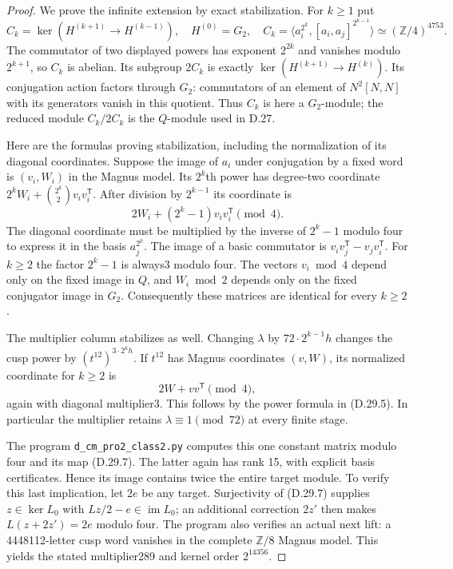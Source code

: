 \begin{proof}
We prove the infinite extension by exact stabilization.
For $k\geq1$ put
\[
 C_k=\ker(H^{(k+1)}\to H^{(k-1)}),
 \quad H^{(0)}=G_2,
 \quad
 C_k=\langle a_i^{2^k},[a_i,a_j]^{2^{k-1}}\rangle
       \simeq(\mathbb Z/4)^{4753}.                     \tag{D.29.8}
\]
The commutator of two displayed powers has exponent
$2^{2k}$ and vanishes modulo $2^{k+1}$, so $C_k$ is
abelian. Its subgroup $2C_k$ is exactly
$\ker(H^{(k+1)}\to H^{(k)})$. Its conjugation action
factors through $G_2$: commutators of an element of
$N^2[N,N]$ with its generators vanish in this quotient.
Thus $C_k$ is here a $G_2$-module; the reduced module
$C_k/2C_k$ is the $Q$-module used in D.27.

Here are the formulas proving stabilization, including
the normalization of its diagonal coordinates. Suppose
the image of $a_i$ under conjugation by a fixed word is
$(v_i,W_i)$ in the Magnus model. Its $2^k$th power has
degree-two coordinate
$2^kW_i+\binom{2^k}{2}v_iv_i^{\mathsf T}$.
After division by $2^{k-1}$ its coordinate is
\[
              2W_i+(2^k-1)v_iv_i^{\mathsf T}\pmod4.   \tag{D.29.9}
\]
The diagonal coordinate must be multiplied by the inverse
of $2^k-1$ modulo four to express it in the basis
$a_j^{2^k}$. The image of a basic commutator is
$v_iv_j^{\mathsf T}-v_jv_i^{\mathsf T}$.
For $k\geq2$ the factor $2^k-1$ is always3 modulo four.
The vectors $v_i\bmod4$ depend only on the fixed image
in $Q$, and $W_i\bmod2$ depends only on the fixed
conjugator image in $G_2$. Consequently these matrices
are identical for every $k\geq2$.

The multiplier column stabilizes as well. Changing
$\lambda$ by $72\cdot2^{k-1}h$ changes the cusp power
by $(t^{12})^{3\cdot2^k h}$. If $t^{12}$ has Magnus
coordinates $(v,W)$, its normalized coordinate for
$k\geq2$ is
\[
                  2W+vv^{\mathsf T}\pmod4,             \tag{D.29.10}
\]
again with diagonal multiplier3. This follows by the
power formula in (D.29.5). In particular the multiplier
retains $\lambda\equiv1\pmod{72}$ at every finite stage.

The program \texttt{d\_cm\_pro2\_class2.py} computes this
one constant matrix modulo four and its map (D.29.7).
The latter again has rank 15, with explicit basis
certificates. Hence its image contains twice the entire
target module. To verify this last implication, let
$2e$ be any target. Surjectivity of (D.29.7) supplies
$z\in\ker L_0$ with $Lz/2-e\in\operatorname{im}L_0$;
an additional correction $2z'$ then makes
$L(z+2z')=2e$ modulo four.
The program also verifies an actual next lift: a
4448112-letter cusp word vanishes in the complete
$\mathbb Z/8$ Magnus model. This yields the stated
multiplier289 and kernel order $2^{14356}$.


\end{proof}
